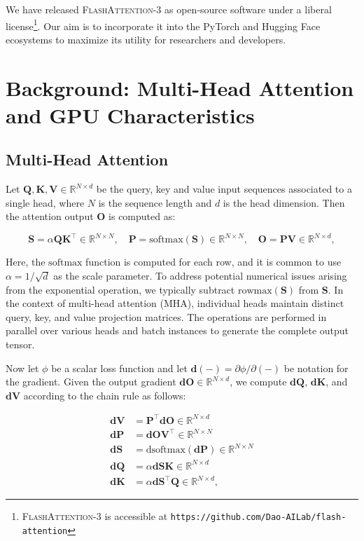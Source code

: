 We have released \textsc{FlashAttention-3} as open-source software under a liberal license\footnote{\textsc{FlashAttention-3} is accessible at \texttt{https://github.com/Dao-AILab/flash-attention}}. Our aim is to incorporate it into the PyTorch and Hugging Face ecosystems to maximize its utility for researchers and developers.

\section{Background: Multi-Head Attention and GPU Characteristics}
\label{sec:background}

\subsection{Multi-Head Attention}
\label{subsec:multi_head_attn}

Let $\mathbf{Q}, \mathbf{K}, \mathbf{V} \in \mathbb{R}^{N \times d}$ be the query, key and value input sequences associated to a single head, where $N$ is the sequence length and $d$ is the head dimension. Then the attention output $\mathbf{O}$ is computed as:

\begin{equation*}
  \mathbf{S} = \alpha \mathbf{Q} \mathbf{K}^\top \in \mathbb{R}^{N \times N}, \quad \mathbf{P} = \mathrm{softmax}(\mathbf{S}) \in \mathbb{R}^{N \times N}, \quad \mathbf{O} = \mathbf{P}\mathbf{V} \in \mathbb{R}^{N \times d},
\end{equation*}

Here, the $\mathrm{softmax}$ function is computed for each row, and it is common to use $\alpha = 1/\sqrt{d}$ as the scale parameter. To address potential numerical issues arising from the exponential operation, we typically subtract $\mathrm{rowmax}(\mathbf{S})$ from $\mathbf{S}$. In the context of multi-head attention (MHA), individual heads maintain distinct query, key, and value projection matrices. The operations are performed in parallel over various heads and batch instances to generate the complete output tensor.

Now let $\phi$ be a scalar loss function and let $\mathbf{d}(-) = \partial \phi / \partial (-)$ be notation for the gradient. Given the output gradient $\mathbf{dO} \in \mathbb{R}^{N \times d}$, we compute $\mathbf{dQ}$, $\mathbf{dK}$, and $\mathbf{dV}$ according to the chain rule as follows:

\begin{align*}
  \mathbf{dV} &= \mathbf{P}^\top \mathbf{dO} \in \mathbb{R}^{N \times d} \\
  \mathbf{dP} &= \mathbf{dO} \mathbf{V}^\top \in \mathbb{R}^{N \times N} \\
  \mathbf{dS} &= \mathrm{dsoftmax} (\mathbf{dP}) \in \mathbb{R}^{N \times N} \\
  \mathbf{dQ} &= \alpha \mathbf{dS} \mathbf{K} \in \mathbb{R}^{N \times d} \\
  \mathbf{dK} &= \alpha \mathbf{dS}^\top \mathbf{Q} \in \mathbb{R}^{N \times d},
\end{align*}

